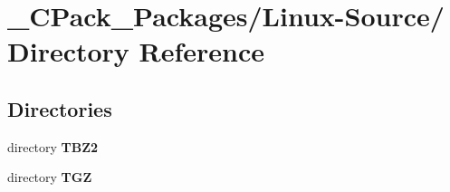 \section{\_\-CPack\_\-Packages/Linux-\/Source/ Directory Reference}
\label{dir_9fe30774bc31abd6ed1cae73a65efa8e}
\subsection*{Directories}
\begin{DoxyCompactItemize}
\item 
directory {\bf TBZ2}
\item 
directory {\bf TGZ}
\end{DoxyCompactItemize}
